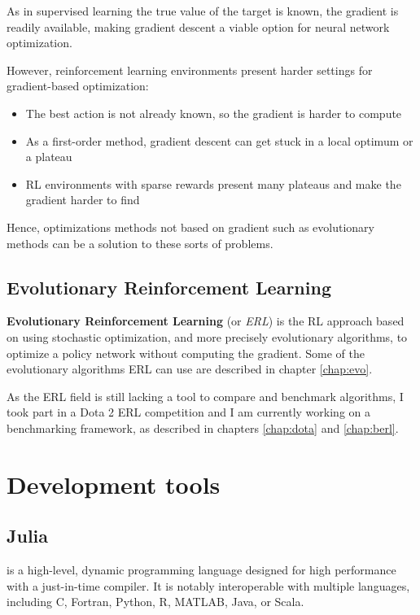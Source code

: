 As in supervised learning the true value of the target is known, the gradient is readily available, making gradient descent a viable option for neural network optimization. 

However, reinforcement learning environments present harder settings for gradient-based optimization:

\begin{itemize}
    \item The best action is not already known, so the gradient is harder to compute
    \item As a first-order method, gradient descent can get stuck in a local optimum or a plateau
    \item RL environments with sparse rewards present many plateaus and make the gradient harder to find
\end{itemize}

Hence, optimizations methods not based on gradient such as evolutionary methods can be a solution to these sorts of problems.

\subsection{Evolutionary Reinforcement Learning}
\label{sec:ERL}

\textbf{Evolutionary Reinforcement Learning} (or \textit{ERL}) is the RL approach based on using stochastic optimization, and more precisely evolutionary algorithms, to optimize a policy network without computing the gradient. Some of the evolutionary algorithms ERL can use are described in chapter \ref{chap:evo}.

As the ERL field is still lacking a tool to compare and benchmark algorithms, I took part in a Dota 2 ERL competition and I am currently working on a benchmarking framework, as described in chapters \ref{chap:dota} and \ref{chap:berl}.

\section{Development tools}
\subsection{Julia}
    
 is a high-level, dynamic programming language designed for high performance with a just-in-time compiler. It is notably interoperable with multiple languages, including C, Fortran, Python, R, MATLAB, Java, or Scala. \cite{julia-lang}

